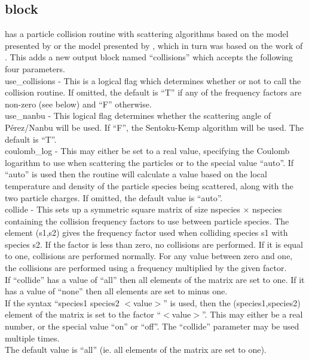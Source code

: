 
\subsection{\texorpdfstring
  { block}
  {           {collisions} block}}
\label{sec:collisions_block}
{\EPOCH} has a particle collision routine with scattering algorithms based on
the model presented by \citet{Sentoku} or the model presented by
\citet{Perez}, which in turn was based on the work of \citet{Nanbu}.
This adds a new output block named ``collisions'' which accepts the
following four parameters.\\

{\emphtext use\_collisions} - This is a logical flag which determines whether
  or not to call the collision routine. If omitted, the default is ``T'' if any
  of the frequency factors are non-zero (see below) and ``F'' otherwise.\\

{\emphtext use\_nanbu} - This logical flag determines whether the scattering
  angle of P\'erez/Nanbu will be used. If ``F'', the Sentoku-Kemp algorithm will
  be used. The default is ``T''.\\

{\emphtext coulomb\_log} - This may either be set to a real value, specifying
  the Coulomb logarithm to use when scattering the particles or to the special
  value ``auto''. If ``auto'' is used then the routine will calculate a value
  based on the local temperature and density of the particle species being
  scattered, along with the two particle charges.  If omitted,
  the default value is ``auto''.\\

{\emphtext collide} - This sets up a symmetric square matrix of size
  nspecies$\,\times\,$nspecies containing the collision frequency factors to
  use between particle species. The element (s1,s2) gives the frequency factor
  used when colliding species s1 with species s2.  If the factor is less than
  zero, no collisions are performed.  If it is equal to one, collisions are
  performed normally.  For any value between zero and one, the collisions are
  performed using a frequency multiplied by the given factor.\\
  If ``collide'' has a value of ``all'' then all elements of the matrix are
  set to one. If it has a value of ``none'' then all elements are set to minus
  one.\\
  If the syntax ``species1 species2 $<$value$>$'' is used, then the
  (species1,species2) element of the matrix is set to the factor
  ``$<$value$>$''.  This may either be a real number, or the special value
  ``on'' or ``off''. The ``collide'' parameter may be used multiple times.\\
  The default value is ``all'' (ie. all elements of the matrix are set to
  one).\\

